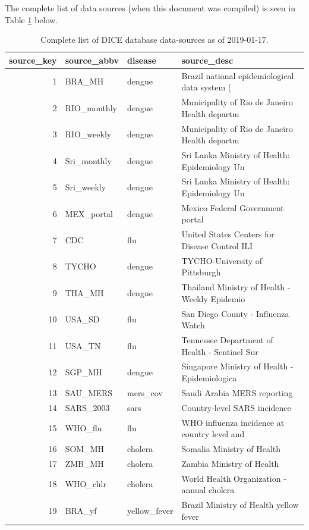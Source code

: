\documentclass[a4paper]{article}
\begin{document}
The complete list of data sources (when this document was compiled) is seen in Table \ref{tab:sources} below.
\begin{table}[ht]
\centering
\caption{Complete list of DICE database data-sources as of 2019-01-17.} 
\label{tab:sources}
\begin{tabular}{|r|l|l|l|}
  \hline
source\_key & source\_abbv & disease & source\_desc \\ 
  \hline
  1 & BRA\_MH & dengue & Brazil national epidemiological data system ( \\ 
    2 & RIO\_monthly & dengue & Municipality of Rio de Janeiro Health departm \\ 
    3 & RIO\_weekly & dengue & Municipality of Rio de Janeiro Health departm \\ 
    4 & Sri\_monthly & dengue & Sri Lanka Ministry of Health: Epidemiology Un \\ 
    5 & Sri\_weekly & dengue & Sri Lanka Ministry of Health: Epidemiology Un \\ 
    6 & MEX\_portal & dengue & Mexico Federal Government portal \\ 
    7 & CDC & flu & United States Centers for Disease Control ILI \\ 
    8 & TYCHO & dengue & TYCHO-University of Pittsburgh  \\ 
    9 & THA\_MH & dengue & Thailand Ministry of Health - Weekly Epidemio \\ 
   10 & USA\_SD & flu & San Diego County - Influenza Watch \\ 
   11 & USA\_TN & flu & Tennessee Department of Health - Sentinel Sur \\ 
   12 & SGP\_MH & dengue & Singapore Ministry of Health - Epidemiologica \\ 
   13 & SAU\_MERS & mers\_cov & Saudi Arabia MERS reporting \\ 
   14 & SARS\_2003 & sars & Country-level SARS incidence \\ 
   15 & WHO\_flu & flu & WHO influenza incidence at country level and  \\ 
   16 & SOM\_MH & cholera & Somalia Ministry of Health \\ 
   17 & ZMB\_MH & cholera & Zambia Ministry of Health \\ 
   18 & WHO\_chlr & cholera & World Health Organization - annual cholera \\ 
   19 & BRA\_yf & yellow\_fever & Brazil Ministry of Health yellow fever \\ 

\end{tabular}
\end{table}
\end{document}
